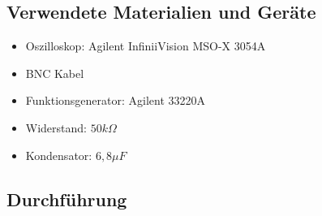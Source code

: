 \documentclass[12pt,a4paper,titlepage]{article}
\begin{document}
\subsection{Verwendete Materialien und Ger\"ate}
\begin{itemize}
  \item Oszilloskop: Agilent InfiniiVision MSO-X 3054A
  \item BNC Kabel
  \item Funktionsgenerator: Agilent 33220A
  \item Widerstand: $50 k\Omega$
  \item Kondensator: $6,8 \mu F$
\end{itemize}

\subsection{Durchf\"uhrung}
\end{document}
